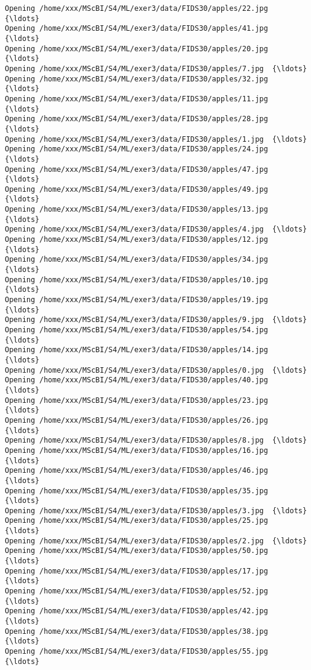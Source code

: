 \documentclass[11pt]{article}
\begin{document}
\begin{Verbatim}[commandchars=\\\{\}]
Opening /home/xxx/MScBI/S4/ML/exer3/data/FIDS30/apples/22.jpg  {\ldots}
Opening /home/xxx/MScBI/S4/ML/exer3/data/FIDS30/apples/41.jpg  {\ldots}
Opening /home/xxx/MScBI/S4/ML/exer3/data/FIDS30/apples/20.jpg  {\ldots}
Opening /home/xxx/MScBI/S4/ML/exer3/data/FIDS30/apples/7.jpg  {\ldots}
Opening /home/xxx/MScBI/S4/ML/exer3/data/FIDS30/apples/32.jpg  {\ldots}
Opening /home/xxx/MScBI/S4/ML/exer3/data/FIDS30/apples/11.jpg  {\ldots}
Opening /home/xxx/MScBI/S4/ML/exer3/data/FIDS30/apples/28.jpg  {\ldots}
Opening /home/xxx/MScBI/S4/ML/exer3/data/FIDS30/apples/1.jpg  {\ldots}
Opening /home/xxx/MScBI/S4/ML/exer3/data/FIDS30/apples/24.jpg  {\ldots}
Opening /home/xxx/MScBI/S4/ML/exer3/data/FIDS30/apples/47.jpg  {\ldots}
Opening /home/xxx/MScBI/S4/ML/exer3/data/FIDS30/apples/49.jpg  {\ldots}
Opening /home/xxx/MScBI/S4/ML/exer3/data/FIDS30/apples/13.jpg  {\ldots}
Opening /home/xxx/MScBI/S4/ML/exer3/data/FIDS30/apples/4.jpg  {\ldots}
Opening /home/xxx/MScBI/S4/ML/exer3/data/FIDS30/apples/12.jpg  {\ldots}
Opening /home/xxx/MScBI/S4/ML/exer3/data/FIDS30/apples/34.jpg  {\ldots}
Opening /home/xxx/MScBI/S4/ML/exer3/data/FIDS30/apples/10.jpg  {\ldots}
Opening /home/xxx/MScBI/S4/ML/exer3/data/FIDS30/apples/19.jpg  {\ldots}
Opening /home/xxx/MScBI/S4/ML/exer3/data/FIDS30/apples/9.jpg  {\ldots}
Opening /home/xxx/MScBI/S4/ML/exer3/data/FIDS30/apples/54.jpg  {\ldots}
Opening /home/xxx/MScBI/S4/ML/exer3/data/FIDS30/apples/14.jpg  {\ldots}
Opening /home/xxx/MScBI/S4/ML/exer3/data/FIDS30/apples/0.jpg  {\ldots}
Opening /home/xxx/MScBI/S4/ML/exer3/data/FIDS30/apples/40.jpg  {\ldots}
Opening /home/xxx/MScBI/S4/ML/exer3/data/FIDS30/apples/23.jpg  {\ldots}
Opening /home/xxx/MScBI/S4/ML/exer3/data/FIDS30/apples/26.jpg  {\ldots}
Opening /home/xxx/MScBI/S4/ML/exer3/data/FIDS30/apples/8.jpg  {\ldots}
Opening /home/xxx/MScBI/S4/ML/exer3/data/FIDS30/apples/16.jpg  {\ldots}
Opening /home/xxx/MScBI/S4/ML/exer3/data/FIDS30/apples/46.jpg  {\ldots}
Opening /home/xxx/MScBI/S4/ML/exer3/data/FIDS30/apples/35.jpg  {\ldots}
Opening /home/xxx/MScBI/S4/ML/exer3/data/FIDS30/apples/3.jpg  {\ldots}
Opening /home/xxx/MScBI/S4/ML/exer3/data/FIDS30/apples/25.jpg  {\ldots}
Opening /home/xxx/MScBI/S4/ML/exer3/data/FIDS30/apples/2.jpg  {\ldots}
Opening /home/xxx/MScBI/S4/ML/exer3/data/FIDS30/apples/50.jpg  {\ldots}
Opening /home/xxx/MScBI/S4/ML/exer3/data/FIDS30/apples/17.jpg  {\ldots}
Opening /home/xxx/MScBI/S4/ML/exer3/data/FIDS30/apples/52.jpg  {\ldots}
Opening /home/xxx/MScBI/S4/ML/exer3/data/FIDS30/apples/42.jpg  {\ldots}
Opening /home/xxx/MScBI/S4/ML/exer3/data/FIDS30/apples/38.jpg  {\ldots}
Opening /home/xxx/MScBI/S4/ML/exer3/data/FIDS30/apples/55.jpg  {\ldots}

\end{Verbatim}
\end{document}
